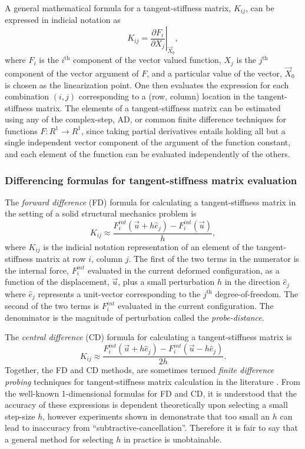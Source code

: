 \documentclass[preprint,12pt]{elsarticle}
\begin{document}
A general mathematical formula for a tangent-stiffness matrix, $K_{ij}$, can be expressed in indicial notation as 
%
\begin{equation} K_{ij} = \left. \frac{\partial F_i}{\partial
X_j}\right|_{\vec{X}_0}, \end{equation}
%
where $F_i$ is the $i^{\mbox{th}}$ component of the vector valued function, $X_j$ is the $j^{\mbox{th}}$ component of the vector argument of $F$, and a particular value of the vector, $\vec{X}_0$ is chosen as the linearization point. One then evaluates the expression for each combination $(i, j)$ corresponding to a (row, column) location in the tangent-stiffness matrix. The
elements of a tangent-stiffness matrix can be estimated using any of the complex-step, AD, or common finite difference techniques for functions $F:R^1 \rightarrow R^1$, since taking partial derivatives entails holding all but a single independent vector component of the argument of the function constant, and each element of the function can be evaluated independently of the others. \\ 

\subsubsection{Differencing formulas for tangent-stiffness matrix evaluation}

The \emph{forward difference} (FD) formula for calculating a tangent-stiffness matrix in the setting of a solid structural mechanics problem is 
%
\begin{equation} 
  K_{ij} \approx \frac{F_i^{int}(\vec{u} + h \hat{e}_j) - F_i^{int}(\vec{u})}{h},
\end{equation}
%
where $K_{ij}$ is the indicial notation representation of an element of the tangent-stiffness matrix at row $i$, column $j$. The first of the two terms in the numerator is the internal force, $F_i^{int}$ evaluated in the current deformed configuration, as a function of the displacement, $\vec{u}$,  plus a small perturbation $h$ in the direction $\hat{e}_j$ where $\hat{e}_j$ represents a unit-vector corresponding to the $j^{\mbox{th}}$ degree-of-freedom. The second of the two terms is $F_i^{int}$ evaluated in the current configuration. The denominator is the
magnitude of perturbation called the \emph{probe-distance}.

The \emph{central difference} (CD) formula for calculating a tangent-stiffness matrix is
%
\begin{equation} 
  K_{ij} \approx \frac{F_i^{int}(\vec{u} + h \hat{e}_j) - F_i^{int}(\vec{u} - h \hat{e}_j)}{2 h}.
\end{equation}
%
Together, the FD and CD methods, are sometimes termed \emph{finite difference probing} techniques for tangent-stiffness matrix calculation in the literature \cite{ref-Adaggio}. From the well-known 1-dimensional formulas for FD and CD, it is understood that the accuracy of these expressions is dependent theoretically upon selecting a small step-size $h$, however experiments shown in \cite{squire1998using} demonstrate that too small an $h$ can lead to inaccuracy from ``subtractive-cancellation''. Therefore it is fair to say that a general method for selecting $h$ in practice is unobtainable.
\end{document}
